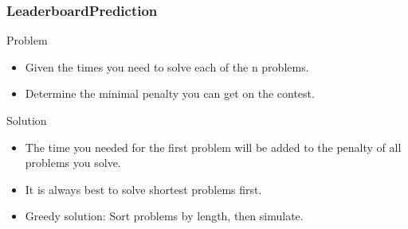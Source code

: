 \documentclass{beamer}
\begin{document}
\begin{frame}
    \frametitle{LeaderboardPrediction}
    \begin{block}{Problem}
        \begin{itemize}
            \item Given the times you need to solve each of the n problems.
            \item Determine the minimal penalty you can get on the contest.
        \end{itemize}
    \end{block}
    \begin{block}{Solution}
        \begin{itemize}
            \item The time you needed for the first problem will be added to the penalty of all problems you solve.
            \item It is always best to solve shortest problems first.
            \item Greedy solution: Sort problems by length, then simulate.
        \end{itemize}
    \end{block}
\end{frame}
\end{document}
